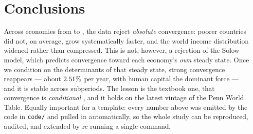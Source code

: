 \documentclass[11pt]{article}
\begin{document}
\section{Conclusions}
\label{sec:conclusions}
Across \Nabs{} economies from \startYear{} to \finalYear, the data reject
\emph{absolute} convergence: poorer countries did not, on average, grow
systematically faster, and the world income distribution widened rather than
compressed. This is not, however, a rejection of the Solow model, which predicts
convergence toward each economy's \emph{own} steady state. Once we condition on
the determinants of that steady state, strong convergence reappears --- about
$2.51\%$ per year, with human capital the dominant force --- and it is stable
across subperiods. The lesson is the textbook one, that convergence is
\emph{conditional} \citep{mrw1992, barrosala2004}, and it holds on the latest
vintage of the Penn World Table. Equally important for a template: every number
above was emitted by the code in \texttt{code/} and pulled in automatically, so
the whole study can be reproduced, audited, and extended by re-running a single
command.



\end{document}
